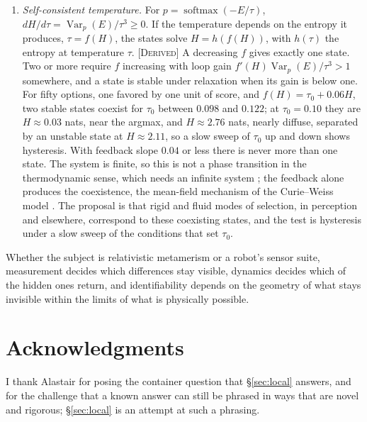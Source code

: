 \documentclass[11pt]{article}
\theoremstyle{boldplain}
\theoremstyle{boldupright}
\newcommand{\derived}{[\textup{\textsc{Derived}}]}
\newcommand{\proposed}{[\textup{\textsc{Proposed}}]}
\begin{document}
\begin{enumerate}[leftmargin=*]
\item \proposed{} \emph{Self-consistent temperature.} For $p=\operatorname{softmax}(-E/\tau)$, $dH/d\tau=\operatorname{Var}_p(E)/\tau^3\ge0$. If the
temperature depends on the entropy it produces, $\tau=f(H)$, the states solve $H=h(f(H))$, with $h(\tau)$
the entropy at temperature $\tau$. \derived{} A decreasing $f$ gives exactly one state. Two or more require
$f$ increasing with loop gain $f'(H)\operatorname{Var}_p(E)/\tau^3>1$ somewhere, and a state is stable under relaxation
when its gain is below one. For fifty options, one favored by one unit of score, and $f(H)=\tau_0+0.06H$,
two stable states coexist for $\tau_0$ between $0.098$ and $0.122$; at $\tau_0=0.10$ they are $H\approx0.03$ nats, near the
argmax, and $H\approx2.76$ nats, nearly diffuse, separated by an unstable state at $H\approx2.11$, so a slow sweep
of $\tau_0$ up and down shows hysteresis. With feedback slope $0.04$ or less there is never more than one state.
The system is finite, so this is not a phase transition in the thermodynamic sense, which needs an
infinite system \cite{yang1952}; the feedback alone produces the coexistence, the mean-field mechanism of the
Curie--Weiss model \cite{ellis1985}. The proposal is that rigid and fluid modes of selection, in perception and
elsewhere, correspond to these coexisting states, and the test is hysteresis under a slow sweep of the
conditions that set $\tau_0$.
\end{enumerate}

Whether the subject is relativistic metamerism or a robot's sensor suite, measurement decides
which differences stay visible, dynamics decides which of the hidden ones return, and identifiability
depends on the geometry of what stays invisible within the limits of what is physically possible.

\section*{Acknowledgments}
I thank Alastair for posing the container question that \S\ref{sec:local} answers, and for the challenge that a
known answer can still be phrased in ways that are novel and rigorous; \S\ref{sec:local} is an attempt at such a phrasing.
\end{document}

